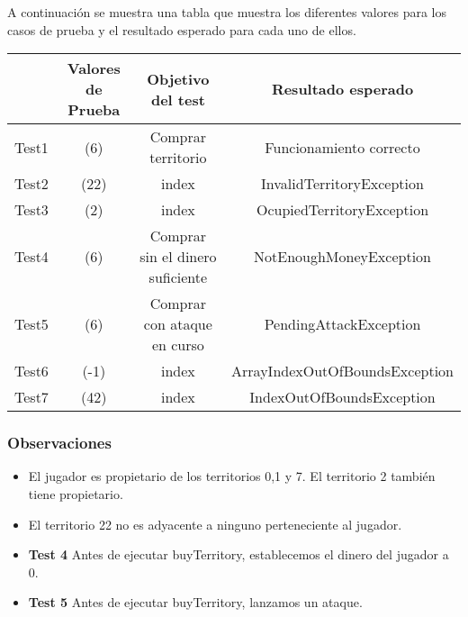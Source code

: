 A continuación se muestra una tabla que muestra los diferentes valores para los casos de prueba y el resultado esperado para cada uno de ellos.

{\footnotesize
\begin{longtable}[c]{lccc}
 & \textbf{Valores de Prueba} & \textbf{Objetivo del test} & \textbf{Resultado esperado}  \\
\hline \hline
\endhead

Test1 & (6)& Comprar territorio & Funcionamiento correcto \\
Test2 & (22) & index & InvalidTerritoryException \\
Test3 & (2)  & index & OcupiedTerritoryException \\
Test4 & (6)  & Comprar sin el dinero suficiente & NotEnoughMoneyException \\
Test5 & (6) & Comprar con ataque en curso  & PendingAttackException \\
Test6 & (-1)  & index & ArrayIndexOutOfBoundsException \\
Test7 & (42)  & index & IndexOutOfBoundsException \\

\hline
\end{longtable}
\subsubsection{Observaciones}
\begin{itemize}
 \item El jugador es propietario de los territorios 0,1 y 7. El territorio 2 también tiene propietario.
\item El territorio 22 no es adyacente a ninguno perteneciente al jugador.
\item \textbf{Test 4} Antes de ejecutar buyTerritory, establecemos el dinero del jugador a 0.
\item \textbf{Test 5} Antes de ejecutar buyTerritory, lanzamos un ataque.
\end{itemize}

}

